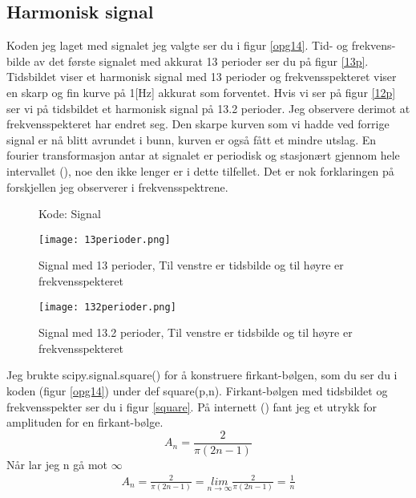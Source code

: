 \documentclass[a4paper,12pt,norsk]{article}
\begin{document}
\subsection{Harmonisk signal}

Koden jeg laget med signalet jeg valgte ser du i figur \vref{opg14}.  Tid- og frekvens-bilde av det første signalet med akkurat 13 perioder ser du på figur \vref{13p}. Tidsbildet viser et harmonisk signal med 13 perioder og frekvensspekteret viser en skarp og fin kurve på 1[Hz] akkurat som forventet. 
Hvis vi ser på figur \vref{12p} ser vi på tidsbildet et harmonisk signal på 13.2 perioder. Jeg observere derimot at frekvensspekteret har endret seg. Den skarpe kurven som vi hadde ved forrige signal er nå blitt avrundet i bunn, kurven er også fått et mindre utslag. En fourier transformasjon antar at signalet er periodisk og stasjonært gjennom hele intervallet (\cite{foreleser}), noe den ikke lenger er i dette tilfellet. Det er nok forklaringen på forskjellen jeg observerer i frekvensspektrene.

\begin{figure}[h!]
\caption{Kode: Signal}

\label{opg14}
\end{figure}

\begin{figure}[h!]
\begin{minipage}[b]{\linewidth}
\centering
\texttt{[image: 13perioder.png]} 
\caption[Signal med 13 perioder]{Signal med 13 perioder, Til venstre er tidsbilde og til høyre er frekvensspekteret }
\label{13p}
\end{minipage}
\hspace{0.5cm}
\begin{minipage}[b]{\linewidth}
\centering
\texttt{[image: 132perioder.png]} 
\caption[Signal med 13.2 perioder]{Signal med 13.2 perioder, Til venstre er tidsbilde og til høyre er frekvensspekteret }
\label{12p}
\end{minipage}
\end{figure}

Jeg brukte scipy.signal.square() for å konstruere firkant-bølgen, som du ser du i koden (figur \vref{opg14}) under def square(p,n). Firkant-bølgen med tidsbildet og frekvensspekter ser du i figur \vref{square}. På internett (\cite{inf}) fant jeg et utrykk for amplituden for en firkant-bølge.
$$
A_n = \frac{2}{\pi (2n-1)}
$$
Når lar jeg n gå mot $\infty$ 
\begin{align*}
A_n = \frac{2}{\pi (2n-1)} = \underset{n\rightarrow \infty}{lim} \frac{2}{\pi (2n-1)} = \frac{1}{n}
\end{align*}
\end{document}
